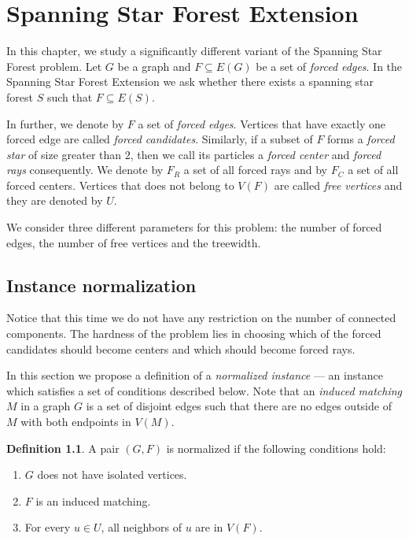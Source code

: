 \documentclass[en]{pracamgr}
\theoremstyle{definition}
\newtheorem{definition}{Definition}
\newcommand{\ssf}{spanning star forest}
\newcommand{\ssfp}{{\sc Spanning Star Forest}}
\newcommand{\ssfep}{{\sc Spanning Star Forest Extension}}
\begin{document}
\chapter{Spanning Star Forest Extension}\label{sec5}

In this chapter, we study a significantly different variant of the \ssfp{} problem. Let $G$ be a graph and $F \subseteq E(G)$ be a set of \emph{forced edges}. In the \ssfep{} we ask whether there exists a \ssf{} $S$ such that $F \subseteq E(S)$.

In further, we denote by $F$ a set of \emph{forced edges}. Vertices that have exactly one forced edge are called \emph{forced candidates}. Similarly, if a subset of $F$ forms a \emph{forced star} of size greater than $2$, then we call its particles a \emph{forced center} and \emph{forced rays} consequently. We denote by $F_R$ a set of all forced rays and by $F_C$ a set of all forced centers. Vertices that does not belong to $V(F)$ are called \emph{free vertices} and they are denoted by $U$. 

We consider three different parameters for this problem: the number of forced edges, the number of free vertices and the treewidth. 

\section{Instance normalization} 

Notice that this time we do not have any restriction on the number of connected components. The hardness of the problem lies in choosing which of the forced candidates should become centers and which should become forced rays. 

In this section we propose a definition of a \emph{normalized instance} --- an instance which satisfies a set of conditions described below. Note that an \emph{induced matching} $M$ in a graph $G$ is a set of disjoint edges such that there are no edges outside of $M$ with both endpoints in $V(M)$.

\begin{definition}\label{norm-ssfe}
	A pair $(G,F)$ is normalized if the following conditions hold:
	\begin{enumerate}
		\item $G$ does not have isolated vertices.
		\item $F$ is an induced matching.
		\item For every $u \in U$, all neighbors of $u$ are in $V(F)$.
	\end{enumerate}
\end{definition}
\end{document}
